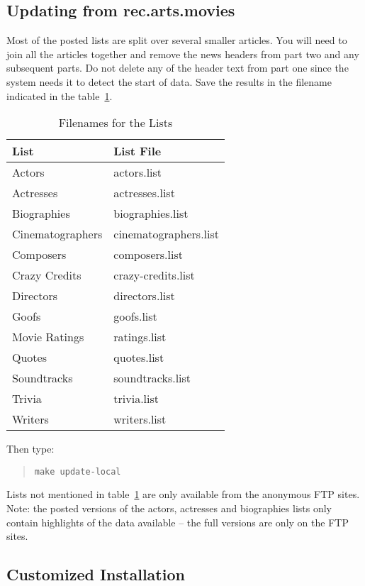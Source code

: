 \subsection{Updating from rec.arts.movies}

Most of the posted lists are split over several smaller articles. You will
need to join all the articles together and remove the news headers from
part two and any subsequent parts. Do not delete any of the header text 
from 
part one since the system needs it to detect the start of data. Save the 
results in the filename indicated in the table~\ref{tbl:fnames}.
\begin{table}
\begin{center}
\begin{tabular}{|l|l|} \hline
List & List File \\ \hline
Actors & actors.list \\ 
Actresses & actresses.list\\
Biographies & biographies.list\\
Cinematographers & cinematographers.list\\
Composers & composers.list \\
Crazy Credits & crazy-credits.list\\ 
Directors & directors.list\\
Goofs & goofs.list\\
Movie Ratings & ratings.list\\
Quotes & quotes.list\\
Soundtracks & soundtracks.list\\
Trivia & trivia.list\\
Writers & writers.list\\ \hline
\end{tabular}
\caption{\label{tbl:fnames} Filenames for the Lists}
\end{center}
\end{table}

Then type:
\begin{quote}
{\tt make update-local}
\end{quote}

Lists not mentioned in table~\ref{tbl:fnames} are only available from the 
anonymous
FTP sites. Note: the posted versions of the actors, actresses and 
biographies
lists only contain highlights of the data available -- the full versions 
are
only on the FTP sites.

\subsection{\label{cstminst}Customized Installation}

